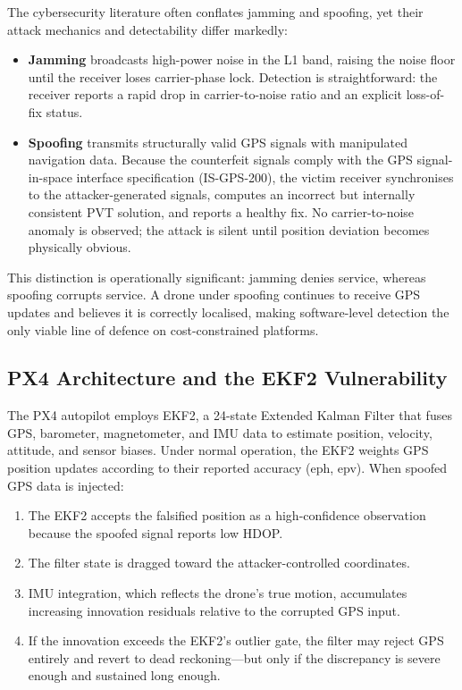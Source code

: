 \documentclass[11pt,a4paper]{article}
\begin{document}
The cybersecurity literature often conflates jamming and spoofing, yet their attack mechanics and detectability differ markedly:

\begin{itemize}
    \item \textbf{Jamming} broadcasts high-power noise in the L1 band, raising the noise floor until the receiver loses carrier-phase lock. Detection is straightforward: the receiver reports a rapid drop in carrier-to-noise ratio and an explicit loss-of-fix status.
    \item \textbf{Spoofing} transmits structurally valid GPS signals with manipulated navigation data. Because the counterfeit signals comply with the GPS signal-in-space interface specification (IS-GPS-200), the victim receiver synchronises to the attacker-generated signals, computes an incorrect but internally consistent PVT solution, and reports a healthy fix. No carrier-to-noise anomaly is observed; the attack is silent until position deviation becomes physically obvious.
\end{itemize}

This distinction is operationally significant: jamming denies service, whereas spoofing corrupts service. A drone under spoofing continues to receive GPS updates and believes it is correctly localised, making software-level detection the only viable line of defence on cost-constrained platforms.

\subsection{PX4 Architecture and the EKF2 Vulnerability}

The PX4 autopilot employs EKF2, a 24-state Extended Kalman Filter that fuses GPS, barometer, magnetometer, and IMU data to estimate position, velocity, attitude, and sensor biases. Under normal operation, the EKF2 weights GPS position updates according to their reported accuracy (eph, epv). When spoofed GPS data is injected:

\begin{enumerate}
    \item The EKF2 accepts the falsified position as a high-confidence observation because the spoofed signal reports low HDOP.
    \item The filter state is dragged toward the attacker-controlled coordinates.
    \item IMU integration, which reflects the drone's true motion, accumulates increasing innovation residuals relative to the corrupted GPS input.
    \item If the innovation exceeds the EKF2's outlier gate, the filter may reject GPS entirely and revert to dead reckoning---but only if the discrepancy is severe enough and sustained long enough.
\end{enumerate}
\end{document}
